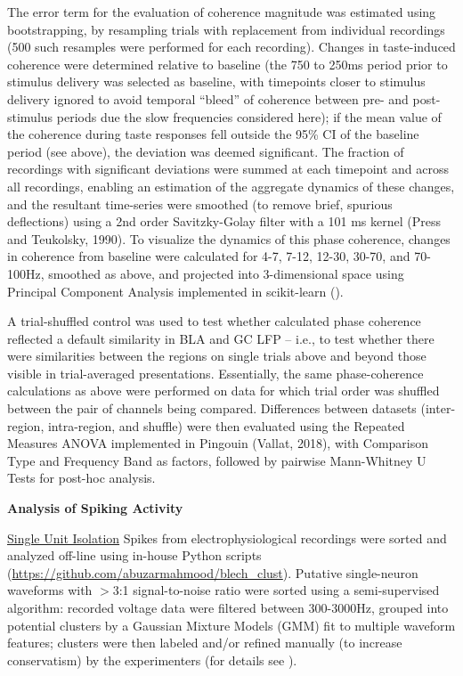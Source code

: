 \begin{refsection}
\noindent The error term for the evaluation of coherence magnitude was estimated using bootstrapping, by resampling trials with replacement from individual recordings (500 such resamples were performed for each recording). Changes in taste-induced coherence were determined relative to baseline (the 750 to 250ms period prior to stimulus delivery was selected as baseline, with timepoints closer to stimulus delivery ignored to avoid temporal “bleed” of coherence between pre- and post-stimulus periods due the slow frequencies considered here); if the mean value of the coherence during taste responses fell outside the 95\% CI of the baseline period (see above), the deviation was deemed significant. The fraction of recordings with significant deviations were summed at each timepoint and across all recordings, enabling an estimation of the aggregate dynamics of these changes, and the resultant time-series were smoothed (to remove brief, spurious deflections) using a 2nd order Savitzky-Golay filter with a 101 ms kernel (Press and Teukolsky, 1990). To visualize the dynamics of this phase coherence, changes in coherence from baseline were calculated for 4-7, 7-12, 12-30, 30-70, and 70-100Hz, smoothed as above, and projected into 3-dimensional space using Principal Component Analysis implemented in scikit-learn (\cite{pedregosa2011a}).

\noindent A trial-shuffled control was used to test whether calculated phase coherence reflected a default similarity in BLA and GC LFP – i.e., to test whether there were similarities between the regions on single trials above and beyond those visible in trial-averaged presentations. Essentially, the same phase-coherence calculations as above were performed on data for which trial order was shuffled between the pair of channels being compared. Differences between datasets (inter-region, intra-region, and shuffle) were then evaluated using the Repeated Measures ANOVA implemented in Pingouin (Vallat, 2018), with Comparison Type and Frequency Band as factors, followed by pairwise Mann-Whitney U Tests for post-hoc analysis.

\noindent\textbf{Analysis of Spiking Activity}\par
\smallskip

\noindent\underline{Single Unit Isolation}
Spikes from electrophysiological recordings were sorted and analyzed off-line using in-house Python scripts (\url{https://github.com/abuzarmahmood/blech_clust}). Putative single-neuron waveforms with \(>\)3:1 signal-to-noise ratio were sorted using a semi-supervised algorithm: recorded voltage data were filtered between 300-3000Hz, grouped into potential clusters by a Gaussian Mixture Models (GMM) fit to multiple waveform features; clusters were then labeled and/or refined manually (to increase conservatism) by the experimenters (for details see \cite{mukherjee2017a}). 


\end{refsection}
